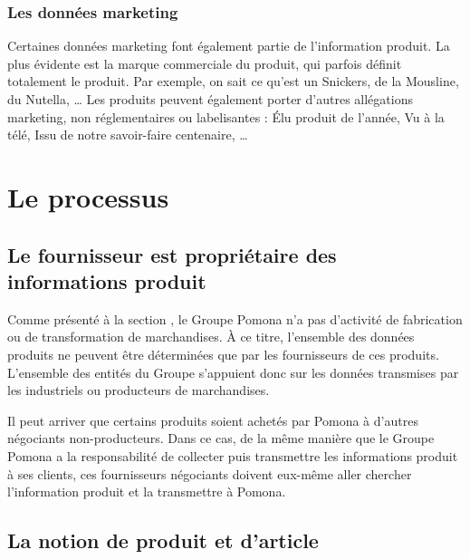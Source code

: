                 \subsubsection{Les données marketing}

                Certaines données marketing font également partie de l'information produit.
                La plus évidente est la marque commerciale du produit, qui parfois définit totalement le produit.
                Par exemple, on sait ce qu'est un Snickers, de la Mousline, du Nutella, \dots
                Les produits peuvent également porter d'autres allégations marketing, non réglementaires ou labelisantes : \'{E}lu produit de l'année, Vu à la télé, Issu de notre savoir-faire centenaire, \dots                

        \section{Le processus}
        
            \subsection{Le fournisseur est propriétaire des informations produit}

            Comme présenté à la section , le Groupe Pomona n'a pas d'activité de fabrication ou de transformation de marchandises.
            \`{A} ce titre, l'ensemble des données produits ne peuvent être déterminées que par les fournisseurs de ces produits.
            L'ensemble des entités du Groupe s'appuient donc sur les données transmises par les industriels ou producteurs de marchandises.

            Il peut arriver que certains produits soient achetés par Pomona à d'autres négociants non-producteurs.
            Dans ce cas, de la même manière que le Groupe Pomona a la responsabilité de collecter puis transmettre les informations produit à ses clients, ces fournisseurs négociants doivent eux-même aller chercher l'information produit et la transmettre à Pomona.


            \subsection{La notion de produit et d'article}

